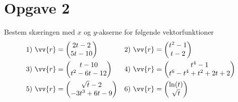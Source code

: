 \section*{Opgave 2}
Bestem skæringen med $x$ og $y$-akserne for følgende vektorfunktioner
\begin{align*}
	&1) \ \vv{r} = 
	\begin{pmatrix}
		2t -2 \\
		5t-10
	\end{pmatrix}
	&&2) \ \vv{r} = 
	\begin{pmatrix}
		t^2-1 \\
		t-2
	\end{pmatrix} \\
	&3) \ \vv{r} = 
	\begin{pmatrix}
		t-10 \\
		t^2-6t-12
	\end{pmatrix}
	&&4) \ \vv{r} = 
	\begin{pmatrix}
		t^4-1 \\
		t^6-t^4+t^2+2t+2
	\end{pmatrix} \\
	&5) \ \vv{r} = 
	\begin{pmatrix}
		\sqrt{t}-2 \\
		-3t^3+6t-9
	\end{pmatrix}
	&&6) \ \vv{r} = 
	\begin{pmatrix}
		\ln(t) \\
		\sqrt{t} \\
	\end{pmatrix}
\end{align*}